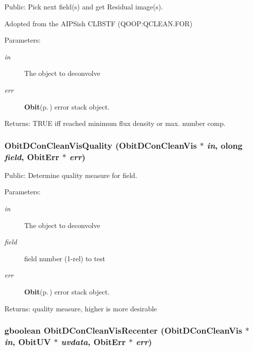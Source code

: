 Public: Pick next field(s) and get Residual image(s). 

Adopted from the AIPSish CLBSTF (QOOP:QCLEAN.FOR) \begin{Desc}
\item[Parameters:]
\begin{description}
\item[{\em in}]The object to deconvolve \item[{\em err}]{\bf Obit}{\rm (p.\,\pageref{structObit})} error stack object. \end{description}
\end{Desc}
\begin{Desc}
\item[Returns:]TRUE iff reached minimum flux density or max. number comp. \end{Desc}
\subsubsection{ Obit\-DCon\-Clean\-Vis\-Quality ({\bf Obit\-DCon\-Clean\-Vis} $\ast$ {\em in}, {\bf olong} {\em field}, {\bf Obit\-Err} $\ast$ {\em err})}\label{ObitDConCleanVis_8h_a21}


Public: Determine quality measure for field. 

\begin{Desc}
\item[Parameters:]
\begin{description}
\item[{\em in}]The object to deconvolve \item[{\em field}]field number (1-rel) to test \item[{\em err}]{\bf Obit}{\rm (p.\,\pageref{structObit})} error stack object. \end{description}
\end{Desc}
\begin{Desc}
\item[Returns:]quality measure, higher is more desirable \end{Desc}
\subsubsection{\setlength{\rightskip}{0pt plus 5cm}gboolean Obit\-DCon\-Clean\-Vis\-Recenter ({\bf Obit\-DCon\-Clean\-Vis} $\ast$ {\em in}, {\bf Obit\-UV} $\ast$ {\em uvdata}, {\bf Obit\-Err} $\ast$ {\em err})}\label{ObitDConCleanVis_8h_a24}


